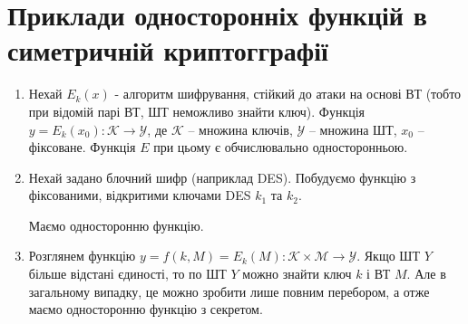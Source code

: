 \section{Приклади односторонніх функцій в симетричній криптогграфії}
\begin{enumerate}
\item 
Нехай $E_{k}(x)$ - алгоритм шифрування, стійкий до атаки на основі ВТ (тобто при відомій парі ВТ, ШТ неможливо знайти ключ). 
Функція $y=E_{k}(x_{0}):\mathcal K \to \mathcal Y$, де $\mathcal K$ -- множина ключів, $\mathcal Y$ -- множина ШТ, $x_{0}$ -- фіксоване. 
Функція $E$ при цьому є обчислювально односторонньою.
\item 
Нехай задано блочний шифр (наприклад DES). Побудуємо функцію з фіксованими, відкритими ключами DES $k_{1}$ та $k_{2}$.\par
\begin{figure}[h]
\end{figure} 
Маємо односторонню функцію.
\item 
Розглянем функцію $y=f(k,M)=E_{k}(M): \mathcal K \times \mathcal M \to \mathcal Y$. Якщо ШТ $Y$ більше
відстані єдиності, то по ШТ $Y$ можно знайти ключ $k$ і ВТ $M$. Але в загальному випадку, це можно зробити
лише повним перебором, а отже маємо односторонню функцію з секретом. 
\end{enumerate}
